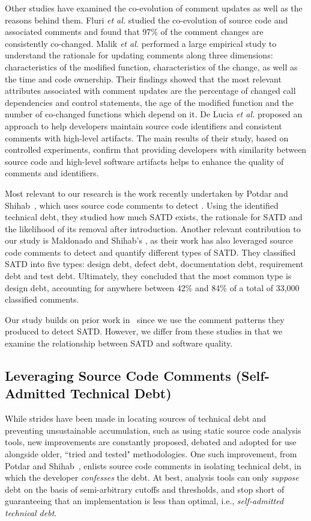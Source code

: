 Other studies have examined the co-evolution of comment updates as well as the reasons behind them. Fluri {\em et al.} \cite{fluri2007code} studied the co-evolution of source code and associated comments and found that 97\% of the comment changes are consistently co-changed. Malik {\em et al.}  \cite{malik2008understanding} performed a large empirical study to understand the rationale for updating comments along three dimensions: characteristics of the modified function, characteristics of the change, as well as the time and code ownership. Their findings showed that the most relevant attributes associated with comment updates are the percentage of changed call dependencies and control statements, the age of the modified function and the number of co-changed functions which depend on it. De Lucia {\em et al.} \cite{DeLucia2011} proposed an approach to help developers maintain source code identifiers and consistent comments with high-level artifacts. The main results of their study, based on controlled experiments, confirm that providing  developers with similarity between source code and high-level software artifacts helps to enhance the quality of comments and identifiers.

Most relevant to our research is the work recently undertaken by Potdar and Shihab~\cite{ICSM_PotdarS14}, which uses source code comments to detect \SATD. Using the identified technical debt, they studied  how much SATD exists, the rationale for SATD and the likelihood of its removal after introduction. Another relevant contribution to our study is Maldonado and Shihab's \cite{MTD15p9}, as their work has also leveraged source code comments to detect and quantify different types of SATD. They classified SATD into five types:  design debt, defect debt, documentation debt, requirement debt and test debt. Ultimately, they concluded that  the  most common type is design debt, accounting for anywhere between 42\% and 84\% of a total of 33,000 classified comments.

Our study builds on prior work in~\cite{ICSM_PotdarS14,MTD15p9} since we use the comment patterns they produced to detect SATD. However, we differ from these studies in that we examine the relationship between SATD and software quality.

\subsection{Leveraging Source Code Comments (Self-Admitted Technical Debt)}

While strides have been made in locating sources of technical debt and preventing unsustainable accumulation, such as using static source code analysis tools, new improvements are constantly proposed, debated and adopted for use alongside older, ``tried and tested" methodologies. One such improvement, from Potdar and Shihab~\cite{ICSM_PotdarS14}, enlists source code comments in isolating technical debt, in which the developer \emph{confesses} the debt. At best, analysis tools can only \emph{suppose} debt on the basis of semi-arbitrary cutoffs and thresholds, and stop short of guaranteeing that an implementation is less than optimal, i.e., \emph{self-admitted technical debt}.\\

